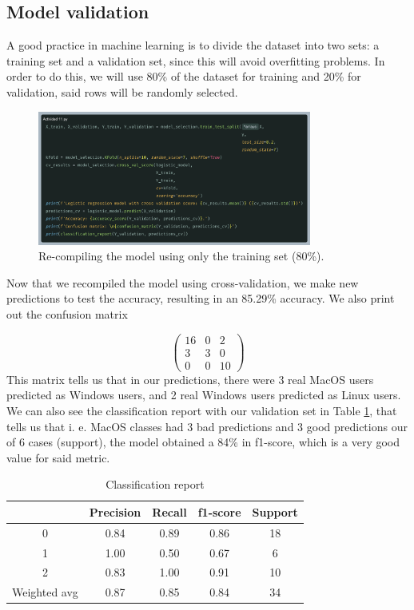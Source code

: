 \documentclass[10pt]{article}
\begin{document}
\subsection{Model validation}
A good practice in machine learning is to divide the dataset into two sets: a training set and a validation set, since this will avoid overfitting problems. \cite{aprendeML} In order to do this, we will use 80\% of the dataset for training and 20\% for validation, said rows will be randomly selected. \par
\begin{figure}[h]
  \centering
  \includegraphics[width=90mm]{./images/2025-03-28-12-24-44.png}
  \caption{Re-compiling the model using only the training set (80\%).}
\end{figure}
Now that we recompiled the model using cross-validation, we make new predictions to test the accuracy, resulting in an 85.29\% accuracy. We also print out the confusion matrix \par
\begin{equation*}
  \left(
    \begin{matrix}
      16 & 0 & 2 \\
      3 & 3 & 0 \\
      0 & 0 & 10
    \end{matrix}
  \right)
\end{equation*}
This matrix tells us that in our predictions, there were 3 real MacOS users predicted as Windows users, and 2 real Windows users predicted as Linux users. We can also see the classification report with our validation set in Table \ref{tbl:classif_report}, that tells us that i. e. MacOS classes had 3 bad predictions and 3 good predictions our of 6 cases (support), the model obtained a 84\% in f1-score, which is a very good value for said metric. 
\begin{table}[!ht]
  \centering
  \caption{Classification report}
  \label{tbl:classif_report}
    \begin{tabular}{|c|c|c|c|c|}
      \hline
       & Precision & Recall & f1-score & Support \\
      \hline
      0 & 0.84 & 0.89 & 0.86 & 18 \\
      \hline
      1 & 1.00 & 0.50 & 0.67 & 6 \\
      \hline
      2 & 0.83 & 1.00 & 0.91 & 10 \\
      \hline
      Weighted avg & 0.87 & 0.85 & 0.84 & 34 \\
      \hline
    \end{tabular}
\end{table}
\end{document}
